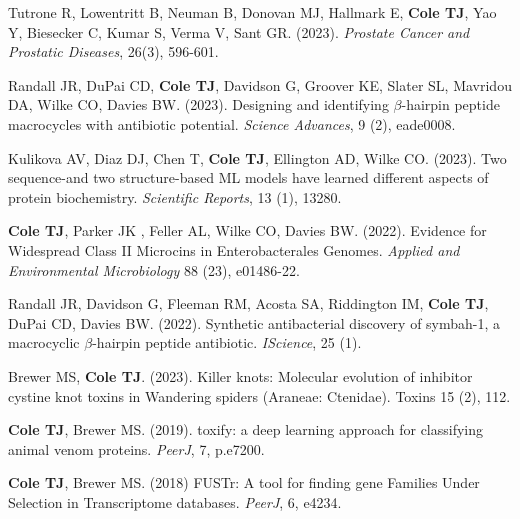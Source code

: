 \documentclass[letterpaper,11pt]{article}
\newlength{\outerbordwidth}
\newcommand{\resheading}[1]{\vspace{8pt}
  \parbox{\textwidth}{\setlength{\FrameSep}{\outerbordwidth}
    \begin{shaded}
\setlength{\fboxsep}{0pt}\framebox[\textwidth][l]{\setlength{\fboxsep}{4pt}\fcolorbox{shadecolorB}{shadecolorB}{\textbf{\sffamily{\mbox{~}\makebox[6.77in][l]{\large #1} \vphantom{p\^{E}}}}}}
    \end{shaded}
  }\vspace{-5pt}
}
\begin{document}
\begin{hangparas}{.25in}{1}
  Tutrone R, Lowentritt B, Neuman B, Donovan MJ, Hallmark E, \textbf{Cole TJ}, Yao Y, Biesecker C, Kumar S, Verma V, Sant GR. (2023). \textit{Prostate Cancer and Prostatic Diseases}, 26(3), 596-601.

  Randall JR, DuPai CD, \textbf{Cole TJ}, Davidson G, Groover KE, Slater SL, Mavridou DA, Wilke CO, Davies BW. (2023). Designing and identifying \(\beta\)-hairpin peptide macrocycles with antibiotic potential. \textit{Science Advances}, 9 (2), eade0008.

  Kulikova AV, Diaz DJ, Chen T, \textbf{Cole TJ}, Ellington AD, Wilke CO. (2023). Two sequence-and two structure-based ML models have learned different aspects of protein biochemistry. \textit{Scientific Reports}, 13 (1), 13280.

  \textbf{Cole TJ}, Parker JK , Feller AL, Wilke  CO, Davies BW. (2022). Evidence for Widespread Class II Microcins in Enterobacterales Genomes. \textit{Applied and Environmental Microbiology} 88 (23), e01486-22.
  
  Randall JR, Davidson G, Fleeman RM, Acosta SA, Riddington IM, \textbf{Cole TJ}, DuPai CD, Davies BW. (2022). Synthetic antibacterial discovery of symbah-1, a macrocyclic \(\beta\)-hairpin peptide antibiotic. \textit{IScience}, 25 (1).
  
  Brewer MS, \textbf{Cole TJ}. (2023). Killer knots: Molecular evolution of inhibitor cystine knot toxins in Wandering spiders (Araneae: Ctenidae). Toxins 15 (2), 112.
  
  \textbf{Cole TJ}, Brewer MS. (2019). toxify: a deep learning approach for classifying animal venom proteins. \textit{PeerJ}, 7, p.e7200.

  \textbf{Cole TJ}, Brewer MS. (2018) FUSTr: A tool for finding gene Families Under Selection in Transcriptome databases. \textit{PeerJ}, 6, e4234.


\end{hangparas}

\end{document}
